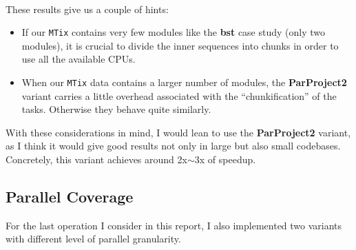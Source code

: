 \documentclass[a4paper,10pt]{article}
\begin{document}
{
}\\

These results give us a couple of hints:

\begin{itemize}
\item If our \texttt{MTix} contains very few modules like the \textbf{bst} case
  study (only two modules), it is crucial to divide the inner sequences into
  chunks in order to use all the available CPUs.
\item When our \texttt{MTix} data contains a larger number of modules, the
  \textbf{ParProject2} variant carries a little overhead associated with the
  ``chunkification'' of the tasks. Otherwise they behave quite similarly.
\end{itemize}

With these considerations in mind, I would lean to use the \textbf{ParProject2}
variant, as I think it would give good results not only in large but also small
codebases.
%
Concretely, this variant achieves around 2x$\sim$3x of speedup.


\subsection*{Parallel Coverage}

For the last operation I consider in this report, I also implemented two
variants with different level of parallel granularity.
\end{document}
